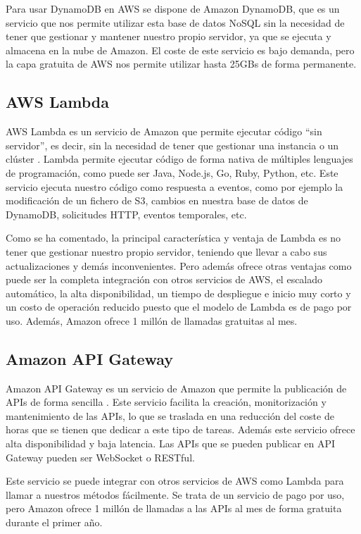Para usar DynamoDB en AWS se dispone de Amazon DynamoDB, que es un servicio que nos permite utilizar esta base de datos NoSQL sin la necesidad de tener que gestionar y mantener nuestro propio servidor, ya que se ejecuta y almacena en la nube de Amazon. El coste de este servicio es bajo demanda, pero la capa gratuita de AWS nos permite utilizar hasta 25GBs de forma permanente.

\subsection{AWS Lambda}

AWS Lambda es un servicio de Amazon que permite ejecutar código ``sin servidor'', es decir, sin la necesidad de tener que gestionar una instancia o un clúster \cite{aws_lambda}. Lambda permite ejecutar código de forma nativa de múltiples lenguajes de programación, como puede ser Java, Node.js, Go, Ruby, Python, etc. Este servicio ejecuta nuestro código como respuesta a eventos, como por ejemplo la modificación de un fichero de S3, cambios en nuestra base de datos de DynamoDB, solicitudes HTTP, eventos temporales, etc. 

Como se ha comentado, la principal característica y ventaja de Lambda es no tener que gestionar nuestro propio servidor, teniendo que llevar a cabo sus actualizaciones y demás inconvenientes. Pero además ofrece otras ventajas como puede ser la completa integración con otros servicios de AWS, el escalado automático, la alta disponibilidad, un tiempo de despliegue e inicio muy corto y un costo de operación reducido puesto que el modelo de Lambda es de pago por uso. Además, Amazon ofrece 1 millón de llamadas gratuitas al mes.

\subsection{Amazon API Gateway}

Amazon API Gateway es un servicio de Amazon que permite la publicación de APIs de forma sencilla \cite{aws_apigateway}. Este servicio facilita la creación, monitorización y mantenimiento de las APIs, lo que se traslada en una reducción del coste de horas que se tienen que dedicar a este tipo de tareas. Además este servicio ofrece alta disponibilidad y baja latencia. Las APIs que se pueden publicar en API Gateway pueden ser WebSocket o RESTful.

Este servicio se puede integrar con otros servicios de AWS como Lambda para llamar a nuestros métodos fácilmente. Se trata de un servicio de pago por uso, pero Amazon ofrece 1 millón de llamadas a las APIs al mes de forma gratuita durante el primer año.

